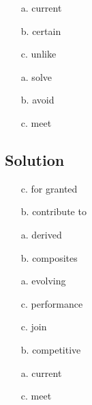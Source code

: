 \begin{enumerate}
      \item[a.] current
      \item[b.] certain
      \item[c.] unlike
\end{enumerate}

\begin{enumerate}
      \item[a.] solve
      \item[b.] avoid
      \item[c.] meet
\end{enumerate}

\subsection*{Solution}
\begin{enumerate}
      \item[c.] for granted
      \item[b.] contribute to
      \item[a.] derived
      \item[b.] composites
      \item[a.] evolving
      \item[c.] performance
      \item[c.] join
      \item[b.] competitive
      \item[a.] current
      \item[c.] meet
\end{enumerate}

